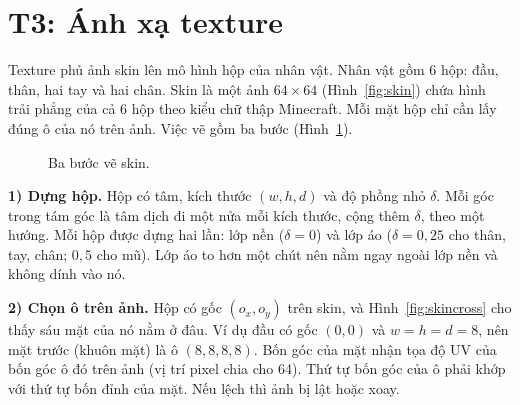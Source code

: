 \documentclass[9pt,twocolumn,a4paper]{extarticle}
\newcommand{\code}[1]{\texttt{#1}}
\begin{document}
\par\noindent{}\par\vspace{3pt}


\section{T3: Ánh xạ texture}
\label{chap:t3}
Texture phủ ảnh skin lên mô hình hộp của nhân vật. Nhân vật gồm 6 hộp: đầu, thân, hai tay và hai chân. Skin là một ảnh $64\times64$ (Hình~\ref{fig:skin}) chứa hình trải phẳng của cả 6 hộp theo kiểu chữ thập Minecraft. Mỗi mặt hộp chỉ cần lấy đúng ô của nó trên ảnh. Việc vẽ gồm ba bước (Hình~\ref{fig:skinflow}).

\begin{figure}[H]
\centering
{}
\caption{Ba bước vẽ skin.}
\label{fig:skinflow}
\end{figure}

\textbf{1) Dựng hộp.} Hộp có tâm, kích thước $(w,h,d)$ và độ phồng nhỏ $\delta$. Mỗi góc trong tám góc là tâm dịch đi một nửa mỗi kích thước, cộng thêm $\delta$, theo một hướng.
Mỗi hộp được dựng hai lần: lớp nền ($\delta=0$) và lớp áo ($\delta=0{,}25$ cho thân, tay, chân; $0{,}5$ cho mũ). Lớp áo to hơn một chút nên nằm ngay ngoài lớp nền và không dính vào nó.

\par\noindent{}\par\vspace{3pt}

\textbf{2) Chọn ô trên ảnh.} Hộp có gốc $(o_x,o_y)$ trên skin, và Hình~\ref{fig:skincross} cho thấy sáu mặt của nó nằm ở đâu. Ví dụ đầu có gốc $(0,0)$ và $w=h=d=8$, nên mặt trước (khuôn mặt) là ô $(8,8,8,8)$. Bốn góc của mặt nhận tọa độ UV của bốn góc ô đó trên ảnh (vị trí pixel chia cho 64). Thứ tự bốn góc của ô phải khớp với thứ tự bốn đỉnh của mặt. Nếu lệch thì ảnh bị lật hoặc xoay.
\end{document}
